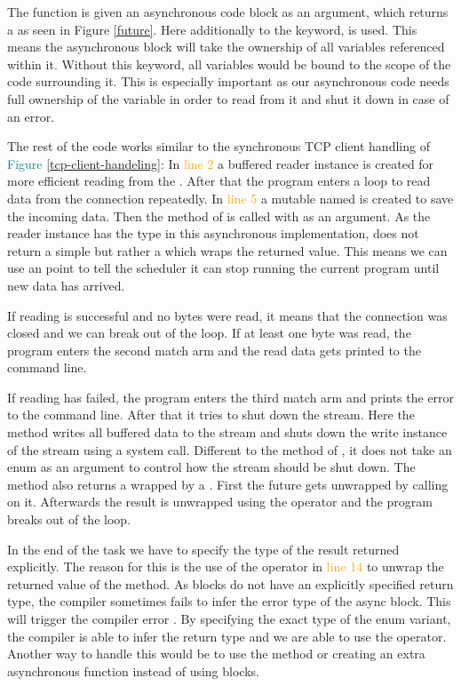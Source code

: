 The function is given an asynchronous code block as an argument, which returns a  as seen in Figure
\textcolor{teal}{\ref{future}}. Here additionally to the  keyword,  is used. This means the
asynchronous block will take the ownership of all variables referenced within it. Without this keyword, all variables
would be bound to the scope of the code surrounding it. This is especially important as our asynchronous code needs
full ownership of the  variable in order to read from it and shut it down in case of an error.

The rest of the code works similar to the synchronous TCP client handling of
\textcolor{teal}{Figure \ref{tcp-client-handeling}}: In \textcolor{orange}{line 2} a buffered reader instance is
created for more efficient reading from the . After that the program enters a loop to read data from
the connection repeatedly. In \textcolor{orange}{line 5} a mutable  named  is created to save
the incoming data. Then the method  of  is called with  as an argument. As the
reader instance has the type  in this asynchronous implementation,  does not
return a simple  but rather a  which wraps the returned value. This means we can use an
 point to tell the scheduler it can stop running the current program until new data has arrived.

If reading is successful and no bytes were read, it means that the connection was closed and we can break out of the
loop. If at least one byte was read, the program enters the second match arm and the read data gets printed to the
command line.

If reading has failed, the program enters the third match arm and prints the error to the command line. After that it
tries to shut down the stream. Here the  method writes all buffered data to the stream and shuts down
the write instance of the stream using a system call. Different to the  method of
, it does not take an enum as an argument to control how the stream should be shut down. The
method also returns a  wrapped by a . First the future gets unwrapped by calling 
on it. Afterwards the result is unwrapped using the  operator and the program breaks out of the loop.

In the end of the task we have to specify the type of the result returned explicitly. The reason for this is the use of
the  operator in \textcolor{orange}{line 14} to unwrap the returned value of the  method. As
 blocks do not have an explicitly specified return type, the compiler sometimes fails to infer the error
type of the async block. This will trigger the compiler error . By specifying the
exact type of the  enum variant, the compiler is able to infer the return type and we are able to use the
 operator. Another way to handle this would be to use the  method or creating an extra
asynchronous function instead of using  blocks. \cite{async-rust}

